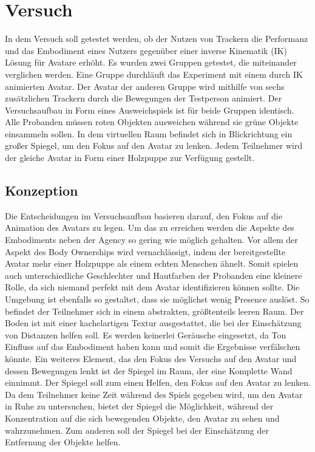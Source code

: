 \chapter{Versuch}
In dem Versuch soll getestet werden, ob der Nutzen von Trackern die Performanz und das Embodiment eines Nutzers gegenüber einer inverse Kinematik (IK) Lösung für Avatare erhöht. Es wurden zwei Gruppen getestet, die miteinander verglichen werden. Eine Gruppe durchläuft das Experiment mit einem durch IK animierten Avatar. Der Avatar der anderen Gruppe wird mithilfe von sechs zusätzlichen Trackern durch die Bewegungen der Testperson animiert. 
Der Versuchsaufbau in Form eines Ausweichspiels ist für beide Gruppen identisch. Alle Probanden müssen roten Objekten ausweichen während sie grüne Objekte einsammeln sollen. In dem virtuellen Raum befindet sich in Blickrichtung ein großer Spiegel, um den Fokus auf den Avatar zu lenken.
Jedem Teilnehmer wird der gleiche Avatar in Form einer Holzpuppe zur Verfügung gestellt.


\section{Konzeption}
Die Entscheidungen im Versuchsaufbau basieren darauf, den Fokus auf die Animation des Avatars zu legen. Um das zu erreichen werden die Aspekte des Embodiments neben der Agency so gering wie möglich gehalten. Vor allem der Aspekt des Body Ownerships wird vernachlässigt, indem der bereitgestellte Avatar mehr einer Holzpuppe als einem echten Menschen ähnelt. Somit spielen auch unterschiedliche Geschlechter und Hautfarben der Probanden eine kleinere Rolle, da sich niemand perfekt mit dem Avatar identifizieren können sollte. Die Umgebung ist ebenfalls so gestaltet, dass sie möglichst wenig Presence auslöst. So befindet der Teilnehmer sich in einem abstrakten, größtenteils leeren Raum. Der Boden ist mit einer kachelartigen Textur ausgestattet, die bei der Einschätzung von Distanzen helfen soll. Es werden keinerlei Geräusche eingesetzt, da Ton Einfluss auf das Embodiment haben kann und somit die Ergebnisse verfälschen könnte. 
Ein weiteres Element, das den Fokus des Versuchs auf den Avatar und dessen Bewegungen lenkt ist der Spiegel im Raum, der eine Komplette Wand einnimmt. Der Spiegel soll zum einen Helfen, den Fokus auf den Avatar zu lenken. Da dem Teilnehmer keine Zeit während des Spiels gegeben wird, um den Avatar in Ruhe zu untersuchen, bietet der Spiegel die Möglichkeit, während der Konzentration auf die sich bewegenden Objekte, den Avatar zu sehen und wahrzunehmen. Zum anderen soll der Spiegel bei der Einschätzung der Entfernung der Objekte helfen.

